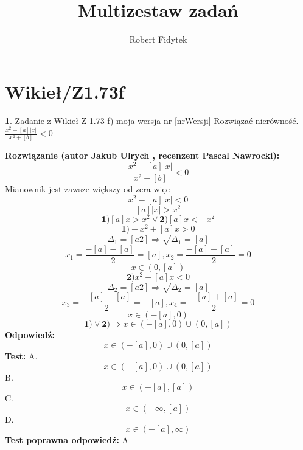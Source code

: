 \documentclass[12pt, a4paper]{article}
\title{Multizestaw zadań}
\author{Robert Fidytek}
\date{}
\theoremstyle{definition} %
\newtheorem{zad}{}
\newcommand{\kategoria}[1]{\section{#1}} %
\newcommand{\zadStart}[1]{\begin{zad}#1\newline} %
\newcommand{\zadStop}{\end{zad}}   %
\newcommand{\rozwStart}[2]{\noindent \textbf{Rozwiązanie (autor #1 , recenzent #2): }\newline} %
\newcommand{\rozwStop}{\newline}                                            %
\newcommand{\odpStart}{\noindent \textbf{Odpowiedź:}\newline}    %
\newcommand{\odpStop}{\newline}                                             %
\newcommand{\testStart}{\noindent \textbf{Test:}\newline} %
\newcommand{\testStop}{\newline} %
\newcommand{\kluczStart}{\noindent \textbf{Test poprawna odpowiedź:}\newline} %
\newcommand{\kluczStop}{\newline} %
\begin{document}
\maketitle


\kategoria{Wikieł/Z1.73f}
\zadStart{Zadanie z Wikieł Z 1.73 f) moja wersja nr [nrWersji]}
Rozwiązać nierówność.$\frac{x^{2}-[a]|x|}{x^{2}+[b]}<0$
\zadStop
\rozwStart{Jakub Ulrych}{Pascal Nawrocki}
$$\frac{x^{2}-[a]|x|}{x^{2}+[b]}<0$$
Mianownik jest zawsze większy od zera więc
$$x^{2}-[a]|x|<0$$
$$[a]|x|>x^{2}$$
$$\textbf{1)}[a]x>x^{2}\vee\textbf{2)}[a]x<-x^{2}$$
$$\textbf{1)}-x^{2}+[a]x>0$$
$$\Delta_{1}=[a2]\Rightarrow \sqrt{\Delta_{1}}=[a]$$
$$x_{1}=\frac{-[a]-[a]}{-2}=[a],x_{2}=\frac{-[a]+[a]}{-2}=0$$
$$x\in(0,[a])$$
$$\textbf{2)}x^{2}+[a]x<0$$
$$\Delta_{2}=[a2]\Rightarrow \sqrt{\Delta_{2}}=[a]$$
$$x_{3}=\frac{-[a]-[a]}{2}=-[a],x_{4}=\frac{-[a]+[a]}{2}=0$$
$$x\in(-[a],0)$$
$$\textbf{1)}\vee\textbf{2)}\Rightarrow x\in(-[a],0)\cup(0,[a])$$
\rozwStop
\odpStart
$$x\in(-[a],0)\cup(0,[a])$$
\odpStop
\testStart
A.$$x\in(-[a],0)\cup(0,[a])$$
B.$$x\in(-[a],[a])$$
C.$$x\in(-\infty,[a])$$
D.$$x\in(-[a],\infty)$$
\testStop
\kluczStart
A
\kluczStop
\end{document}
